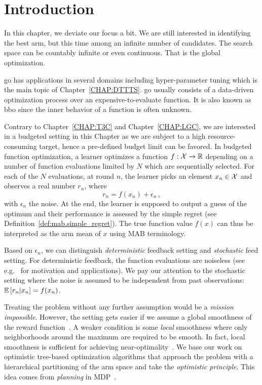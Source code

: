 \section{Introduction}\label{sec:gpo.intro}

In this chapter, we deviate our focus a bit. We are still interested in identifying the best arm, but this time among an infinite number of candidates. The search space can be countably infinite or even continuous. That is the global optimization. 

\gls{go} has applications in several domains including hyper-parameter tuning \citep{jamieson2016hyperband, li2017hyperband,samothrakis2013} which is the main topic of Chapter~\ref{CHAP:DTTTS}. \gls{go} usually consists of a data-driven optimization process over an expensive-to-evaluate function. It is also known as \gls{bbo} since the inner behavior of a function is often unknown.

Contrary to Chapter~\ref{CHAP:T3C} and Chapter~\ref{CHAP:LGC}, we are interested in a budgeted setting in this Chapter as we are subject to a high resource-consuming target, hence a pre-defined budget limit can be favored. In budgeted function optimization, a learner optimizes a function $f: \mathcal{X} \rightarrow \mathbb{R}$ depending on a number of function evaluations limited by $N$ which are sequentially selected. For each of the $N$ evaluations, at round $n$, the learner
picks an element $x_n\in\mathcal{X}$ and observes a real number $r_n$, where 
\[
    r_n = f(x_n) + \epsilon_n\,,
\]
with $\epsilon_n$ the noise. At the end, the learner is supposed to output a guess of the optimum and their performance is assessed by the simple regret (see Definition~\ref{def:mab.simple_regret}). The true function value $f(x)$ can thus be interpreted as the arm mean of $x$ using MAB terminology. 

Based on $\epsilon_n$, we can distinguish \emph{deterministic} feedback setting and \emph{stochastic} feed setting. For deterministic feedback, the function evaluations are noiseless (see e.g.~\citealt{defreitas2012gp} for motivation and applications). We pay our attention to the stochastic setting where the noise is assumed to be independent from past observations: $\mathbb{E}\left[r_n|x_n\right] = f(x_n)$.

Treating the problem without any further assumption would be a \emph{mission impossible}. However, the setting gets easier if we assume a global smoothness of the reward function~\citep{agrawal1995continuum,kleinberg2004nearly,kleinberg2008multi,cope2009,auer2007improved,slivkins2011taxonomy,kleinberg2013}. A weaker condition is some \emph{local} smoothness where only neighborhoods around the maximum are required to be smooth.  In fact, local smoothness is sufficient for achieving near-optimality~\citep{valko2013stosoo,azar2014online,grill2015poo,bull2015adaptive}.
We base our work on optimistic tree-based optimization algorithms \citep{munos2011soo,valko2013stosoo,preux2014bandits,azar2014online} that approach the problem with a hierarchical partitioning of the arm space and take the \textit{optimistic principle}. This idea comes from \emph{planning} in MDP~\citep{kocsis2006bandit,munos2014,grill2016trail}.

